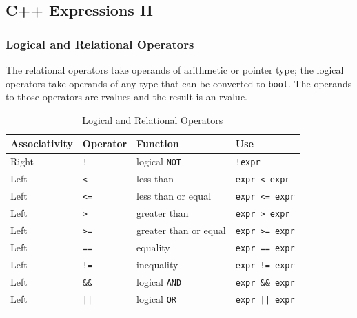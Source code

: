 \subsection{C++ Expressions II}
\label{task:20231205_cpp}

\subsubsection{Logical and Relational Operators}

The relational operators take operands of arithmetic or pointer type; the logical operators take operands of any type that can be converted to \texttt{bool}. The operands to those operators are rvalues and the result is an rvalue.

\begin{longtable}{p{.15\linewidth}p{.1\linewidth}p{.25\linewidth}p{.25\linewidth}} 
\toprule
Associativity & Operator & Function & Use \\
\midrule
\endhead

Right
&\texttt{!}
&logical \texttt{NOT}
&\texttt{!expr}
\\

Left
&\texttt{<}
&less than
&\texttt{expr < expr}
\\

Left
&\texttt{<=}
&less than or equal
&\texttt{expr <= expr}
\\

Left
&\texttt{>}
&greater than
&\texttt{expr > expr}
\\

Left
&\texttt{>=}
&greater than or equal
&\texttt{expr >= expr}
\\

\midrule

Left
&\texttt{==}
&equality
&\texttt{expr == expr}
\\

Left
&\texttt{!=}
&inequality
&\texttt{expr != expr}
\\

\midrule

Left
&\texttt{\&\&}
&logical \texttt{AND}
&\texttt{expr \&\& expr}
\\

\midrule

Left
&\texttt{||}
&logical \texttt{OR}
&\texttt{expr || expr}
\\

\midrule
\caption{Logical and Relational Operators} 
\label{tab:logicalrelationaloperators}
\end{longtable}

